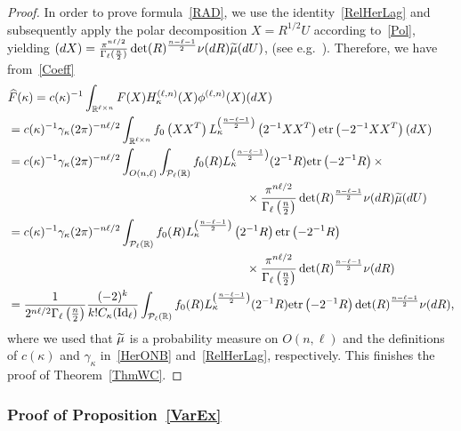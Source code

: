 \documentclass[AHL,Unicode,longabstracts,published]{cedram}
\DeclareMathOperator{\Id}{Id}
\newcommand{\clP}{\mathcal{P}}
\newcommand{\R}{\mathbb{R}}
\newcommand{\etr}[1]{\mathrm{etr}\left(#1\right)}
\let\oldtilde\tilde
\renewcommand*{\tilde}[1]{\mathchoice{\widetilde{#1}}{\widetilde{#1}}{\oldtilde{#1}}{\oldtilde{#1}}}
\let\oldhat\hat
\renewcommand*{\hat}[1]{\mathchoice{\widehat{#1}}{\widehat{#1}}{\oldhat{#1}}{\oldhat{#1}}}
\begin{document}
\begin{proof}
In order to prove formula~\eqref{RAD}, we use the identity~\eqref{RelHerLag} and subsequently apply the polar decomposition $X=R^{1/2}U$ according to~\eqref{Pol}, yielding $ (dX) = \frac{\pi^{n\ell/2}}{\Gamma_{\ell}(\frac{n}{2})} \det(R)^{\frac{n-\ell-1}{2}}\nu(dR)\tilde{\mu}(dU)$, (see e.g.~\cite[Theorem~1.5.2]{Ch2012}). Therefore, we have from~\eqref{Coeff}
\begingroup
\allowdisplaybreaks
\begin{align*}
&\hat{F}(\kappa)= c(\kappa)^{-1}\int_{\R^{\ell\times n}} F(X) H_{\kappa}^{(\ell,n)}(X) \phi^{(\ell,n)}(X)(dX) \\
&= c(\kappa)^{-1} \gamma_{\kappa} (2\pi)^{-n\ell/2} \int_{\R^{\ell\times n}} f_0\left(XX^T\right) L_{\kappa}^{\left(\frac{n-\ell-1}{2}\right)}\left(2^{-1}XX^T\right) \etr{-2^{-1}XX^T}(dX)\\
&= c(\kappa)^{-1} \gamma_{\kappa} (2\pi)^{-n\ell/2} \int_{O(n,\ell)}
\int_{\clP_{\ell}(\R)} f_0(R) L_{\kappa}^{\left(\frac{n-\ell-1}{2}\right)}(2^{-1}R) \etr{-2^{-1}R} \times \\
& \hspace{7cm} \times \frac{\pi^{n\ell/2}}{\Gamma_{\ell}\left(\frac{n}{2}\right)} \det(R)^{\frac{n-\ell-1}{2}}\nu(dR)\tilde{\mu}(dU)\\
&=c(\kappa)^{-1} \gamma_{\kappa}(2\pi)^{-n\ell/2}
\int_{\clP_{\ell}(\R)} f_0(R) L_{\kappa}^{\left(\frac{n-\ell-1}{2}\right)}\left(2^{-1}R\right)\etr{-2^{-1}R} \\
&\hspace{7cm}\times \frac{\pi^{n\ell/2}}{\Gamma_{\ell}\left(\frac{n}{2}\right)} \det(R)^{\frac{n-\ell-1}{2}}\nu(dR) \\
&= \frac{1}{2^{n\ell/2}\Gamma_{\ell}\left(\frac{n}{2}\right)}\frac{(-2)^{k}}{k!C_{\kappa}(\Id_{\ell})}\int_{\clP_{\ell}(\R)} f_0(R) L_{\kappa}^{\left(\frac{n-\ell-1}{2}\right)}(2^{-1}R) \etr{-2^{-1}R} \det(R)^{\frac{n-\ell-1}{2}}\nu(dR),
\end{align*}
\endgroup
where we used that $\tilde{\mu}$ is a probability measure on $O(n,\ell)$ and the definitions of $c(\kappa)$ and $\gamma_{\kappa}$ in~\eqref{HerONB} and~\eqref{RelHerLag}, respectively. This finishes the proof of Theorem~\ref{ThmWC}.
\end{proof}

\subsubsection*{Proof of Proposition~\ref{VarEx}}
\end{document}
